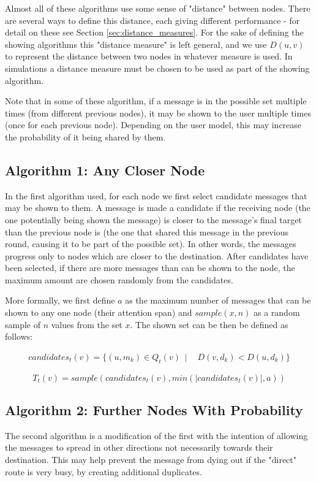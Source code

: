 \documentclass[bsc,frontabs,twoside,singlespacing,parskip,deptreport]{infthesis}     %
\begin{document}
Almost all of these algorithms use some sense of "distance" between nodes. There are several ways to define this distance, each giving different performance - for detail on these see Section \ref{sec:distance_measures}. For the sake of defining the showing algorithms this "distance measure" is left general, and we use $D(u, v)$ to represent the distance between two nodes in whatever measure is used. In simulations a distance measure must be chosen to be used as part of the showing algorithm.

Note that in some of these algorithm, if a message is in the possible set multiple times (from different previous nodes), it may be shown to the user multiple times (once for each previous node). Depending on the user model, this may increase the probability of it being shared by them.

\subsection{Algorithm 1: Any Closer Node}
In the first algorithm used, for each node we first select candidate messages that may be shown to them. A message is made a candidate if the receiving node (the one potentially being shown the message) is closer to the message's final target than the previous node is (the one that shared this message in the previous round, causing it to be part of the possible set). In other words, the messages progress only to nodes which are closer to the destination. After candidates have been selected, if there are more messages than can be shown to the node, the maximum amount are chosen randomly from the candidates. 

More formally, we first define $a$ as the maximum number of messages that can be shown to any one node (their attention span) and $sample(x, n)$ as a random sample of $n$ values from the set $x$. The shown set can be then be defined as follows:

\begin{equation}
\begin{split}
candidates_{t}(v) = \{ (u, m_{k}) \in Q_{t}(v) \:\: | \:\: & D(v, d_{k}) < D(u, d_{k}) \}
\end{split}
\end{equation}

\begin{equation}
T_{t}(v) = sample(candidates_{t}(v), min(|candidates_{t}(v)|, a))
\end{equation}

\subsection{Algorithm 2: Further Nodes With Probability}
The second algorithm is a modification of the first with the intention of allowing the messages to spread in other directions not necessarily towards their destination. This may help prevent the message from dying out if the "direct" route is very busy, by creating additional duplicates.
\end{document}
